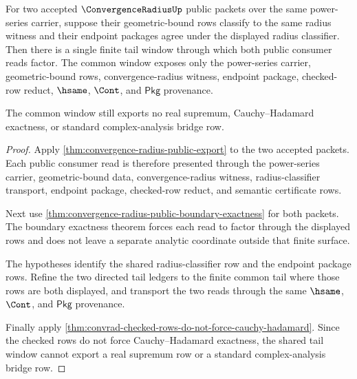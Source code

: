 \begin{theorem}
\label{thm:convergence-radius-geometric-bound-common-tail-window}
For two accepted $\ConvergenceRadiusUp$ public packets over the same
power-series carrier, suppose their geometric-bound rows classify to the same
radius witness and their endpoint packages agree under the displayed radius
classifier. Then there is a single finite tail window through which both
public consumer reads factor. The common window exposes only the power-series
carrier, geometric-bound rows, convergence-radius witness, endpoint package,
checked-row reduct, $\hsame$, $\Cont$, and $\mathsf{Pkg}$ provenance.

The common window still exports no real supremum, Cauchy--Hadamard exactness,
or standard complex-analysis bridge row.
\end{theorem}
\begin{proof}
Apply \autoref{thm:convergence-radius-public-export} to the two accepted
packets. Each public consumer read is therefore presented through the
power-series carrier, geometric-bound data, convergence-radius witness,
radius-classifier transport, endpoint package, checked-row reduct, and
semantic certificate rows.

Next use \autoref{thm:convergence-radius-public-boundary-exactness} for both
packets. The boundary exactness theorem forces each read to factor through
the displayed rows and does not leave a separate analytic coordinate outside
that finite surface.

The hypotheses identify the shared radius-classifier row and the endpoint
package rows. Refine the two directed tail ledgers to the finite common tail
where those rows are both displayed, and transport the two reads through the
same $\hsame$, $\Cont$, and $\mathsf{Pkg}$ provenance.

Finally apply
\autoref{thm:convrad-checked-rows-do-not-force-cauchy-hadamard}. Since the
checked rows do not force Cauchy--Hadamard exactness, the shared tail window
cannot export a real supremum row or a standard complex-analysis bridge row.
\end{proof}

